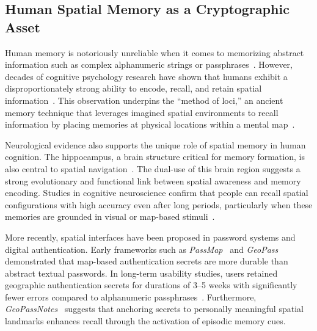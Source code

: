\documentclass[journal,article,accept,pdftex,moreauthors]{Definitions/mdpi}
\begin{document}
\subsection{Human Spatial Memory as a Cryptographic Asset}



Human memory is notoriously unreliable when it comes to memorizing abstract information such as complex alphanumeric strings or passphrases~\cite{Pals2018, Akaygun2014}. However, decades of cognitive psychology research have shown that humans exhibit a disproportionately strong ability to encode, recall, and retain spatial information~\cite{montello1998new, McNamara2003}. This observation underpins the ``method of loci,'' an ancient memory technique that leverages imagined spatial environments to recall information by placing memories at physical locations within a mental map~\cite{Yates2013}.

Neurological evidence also supports the unique role of spatial memory in human cognition. The hippocampus, a brain structure critical for memory formation, is also central to spatial navigation~\cite{McNaughton1991}. The dual-use of this brain region suggests a strong evolutionary and functional link between spatial awareness and memory encoding. Studies in cognitive neuroscience confirm that people can recall spatial configurations with high accuracy even after long periods, particularly when these memories are grounded in visual or map-based stimuli~\cite{Konkle2010, Lukavsky2017}.





More recently, spatial interfaces have been proposed in password systems and digital authentication. Early frameworks such as \textit{PassMap}~\cite{Sun2012} and \textit{GeoPass}~\cite{Thorpe2013} demonstrated that map-based authentication secrets are more durable than abstract textual passwords. In long-term usability studies, users retained geographic authentication secrets for durations of 3--5 weeks with significantly fewer errors compared to alphanumeric passphrases~\cite{Thorpe2013}. Furthermore, \textit{GeoPassNotes}~\cite{MacRae2016} suggests that anchoring secrets to personally meaningful spatial landmarks enhances recall through the activation of episodic memory cues.
\end{document}
